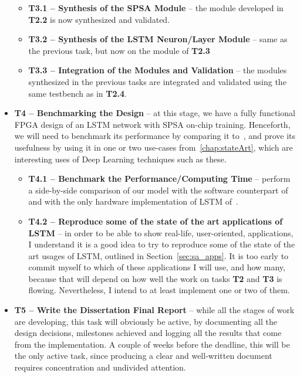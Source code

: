 \begin{itemize}
        \begin{itemize}
            \item \textbf{T3.1 -- Synthesis of the SPSA Module} -- the module developed in \textbf{T2.2} is now synthesized and validated.
            \item \textbf{T3.2 -- Synthesis of the LSTM Neuron/Layer Module} -- same as the previous task, but now on the module of \textbf{T2.3}
            \item \textbf{T3.3 -- Integration of the Modules and Validation} -- the modules synthesized in the previous tasks are integrated and validated using the same testbench as in \textbf{T2.4}.
        \end{itemize}

    \item \textbf{T4 -- Benchmarking the Design} -- at this stage, we have a fully functional FPGA design of an LSTM network with SPSA on-chip training. Henceforth, we will need to benchmark its performance by comparing it to~\cite{Tavear13, Hochreiter07}, and prove its usefulness by using it in one or two use-cases from~\ref{chap:stateArt}, which are interesting uses of Deep Learning techniques such as these.

        \begin{itemize}
            \item \textbf{T4.1 -- Benchmark the Performance/Computing Time} -- perform a side-by-side comparison of our model with the software counterpart of~\cite{Tavear13, Hochreiter07} and with the only hardware implementation of LSTM of~\cite{Chang15}.
            \item \textbf{T4.2 -- Reproduce some of the state of the art applications of LSTM} -- in order to be able to show real-life, user-oriented, applications, I understand it is a good idea to try to reproduce some of the state of the art usages of LSTM, outlined in Section~\ref{sec:sa_apps}. It is too early to commit myself to which of these applications I will use, and how many, because that will depend on how well the work on tasks \textbf{T2} and \textbf{T3} is flowing. Nevertheless, I intend to at least implement one or two of them.
        \end{itemize}

    \item \textbf{T5 -- Write the Dissertation Final Report} -- while all the stages of work are developing, this task will obviously be active, by documenting all the design decisions, milestones achieved and logging all the results that come from the implementation. A couple of weeks before the deadline, this will be the only active task, since producing a clear and well-written document requires concentration and undivided attention.

\end{itemize}

